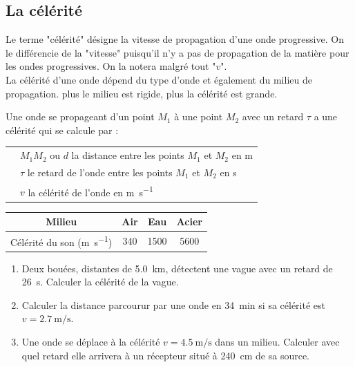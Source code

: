 \documentclass[a4paper,11pt,fleqn]{scrartcl}%
\begin{document}
    \subsection{La célérité}
    Le terme "célérité" désigne la vitesse de propagation d'une onde progressive. On le différencie de la "vitesse" puisqu'il n'y a pas de propagation de la matière pour les ondes progressives. On la notera malgré tout "$v$".\\
    La célérité d'une onde dépend du type d'onde et également du milieu de propagation. plus le milieu est rigide, plus la célérité est grande.

    \begin{cours}
        Une onde se propageant d'un point $M_1$ à une point $M_2$ avec un retard $\tau$ a une célérité qui se calcule par :\\
        \begin{tabular}{>{\centering}m{.3\linewidth}|l}
        \multirow{3}{*}{$ v = \dfrac{M_1M_2}{\tau} = \dfrac{d}{\tau}$} & $M_1M_2$ ou $d$ la distance entre les points $M_1$ et $M_2$ en \unit{\meter}\\
        & $\tau$ le retard de l'onde entre les points $M_1$ et $M_2$ en \unit{\second}\\
        & $v$ la célérité de l'onde en \unit{\meter\per\second}\\
    \end{tabular}
    \end{cours}

    
    \begin{center}
        \begin{tabular}{|c|c|c|c|}
        \hline
        Milieu & Air & Eau & Acier\\
        \hline
        Célérité du son (\unit{\meter\per\second}) & 340 & 1500 & 5600\\
        \hline
    \end{tabular}
    \end{center}

    \begin{exemple}
        \begin{enumerate}
            \item Deux bouées, distantes de \SI{5,0}{km}, détectent une vague avec un retard de \SI{26}{\second}. Calculer la célérité de la vague.
            \item Calculer la distance parcourur par une onde en \SI{34}{min} si sa célérité est $v=\SI{2,7}{\meter\per\second}$.
            \item Une onde se déplace à la célérité $v=\SI{4,5}{\meter\per\second}$ dans un milieu. Calculer avec quel retard elle arrivera à un récepteur situé à \SI{240}{\centi\meter} de sa source.
        \end{enumerate}
    \end{exemple}
\end{document}
